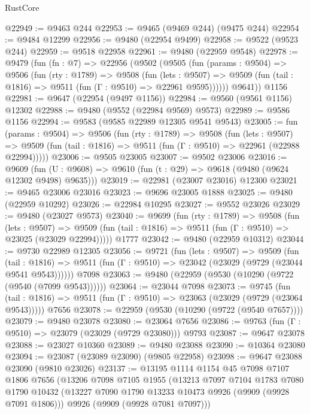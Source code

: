 \begin{lexlean}{RustCore}
\begin{coremodule}
@22949 := @9463 @244
@22953 := @9465 (@9469 @244) (@9475 @244)
@22954 := @9484 @12299
@22956 := @9480 (@22954 @9499)
@22958 := @9522 (@9523 @244)
@22959 := @9518 @22958
@22961 := @9480 (@22959 @9548)
@22978 := @9479
    (fun (fn : @7) =>
    @22956
      (@9502
        (@9505
          (fun (params : @9504) =>
          @9506
            (fun (rty : @1789) =>
            @9508
              (fun (lets : @9507) =>
              @9509 (fun (tail : @1816) => @9511 (fun (Γ : @9510) => @22961 @9595))))))
        @9641))
    @1156
@22981 := @9647 (@22954 (@9497 @1156))
@22984 := @9560 (@9561 @1156) @12302
@22988 := @9480 (@9552 (@22984 @9569) @9573)
@22989 := @9586 @1156
@22994 := @9583 (@9585 @22989 @12305 @9541 @9543)
@23005 := fun (params : @9504) =>
  @9506
    (fun (rty : @1789) =>
    @9508
      (fun (lets : @9507) =>
      @9509 (fun (tail : @1816) => @9511 (fun (Γ : @9510) => @22961 (@22988 @22994)))))
@23006 := @9505 @23005
@23007 := @9502 @23006
@23016 := @9609
    (fun (U : @9608) => @9610 (fun (t : @29) => @9618 (@9480 (@9624 @12302 @9498) @9635)))
@23019 := @22981 (@23007 @23016) @12300
@23021 := @9465 @23006 @23016
@23023 := @9696 @23005 @1888
@23025 := @9480 (@22959 @10292)
@23026 := @22984 @10295
@23027 := @9552 @23026
@23029 := @9480 (@23027 @9573)
@23040 := @9699
    (fun (rty : @1789) =>
    @9508
      (fun (lets : @9507) =>
      @9509 (fun (tail : @1816) => @9511 (fun (Γ : @9510) => @23025 (@23029 @22994)))))
    @1777
@23042 := @9480 (@22959 @10312)
@23044 := @9730 @22989 @12305
@23056 := @9721
    (fun (lets : @9507) =>
    @9509
      (fun (tail : @1816) =>
      @9511 (fun (Γ : @9510) => @23042 (@23029 (@9729 (@23044 @9541 @9543))))))
    @7098
@23063 := @9480 (@22959 (@9530 (@10290 (@9722 (@9540 (@7099 @9543))))))
@23064 := @23044 @7098
@23073 := @9745
    (fun (tail : @1816) => @9511 (fun (Γ : @9510) => @23063 (@23029 (@9729 (@23064 @9543)))))
    @7656
@23078 := @22959 (@9530 (@10290 (@9722 (@9540 @7657))))
@23079 := @9480 @23078
@23080 := @23064 @7656
@23086 := @9763 (fun (Γ : @9510) => @23079 (@23029 (@9729 @23080))) @9793
@23087 := @9647 @23078
@23088 := @23027 @10360
@23089 := @9480 @23088
@23090 := @10364 @23080
@23094 := @23087 (@23089 @23090) (@9805 @22958)
@23098 := @9647 @23088 @23090 (@9810 @23026)
@23137 := @13195
    @1114
    @1154
    @45
    @7098
    @7107
    @1806
    @7656
    (@13206
      @7098
      @7105
      @1955
      (@13213
        @7097
        @7104
        @1783
        @7080
        @1790
        @10432
        (@13227 @7090 @1790 @13233 @10473 @9926 (@9909 (@9928 @7091 @1806)))
        @9926
        (@9909 (@9928 @7081 @7097)))

\end{coremodule}
\end{lexlean}
